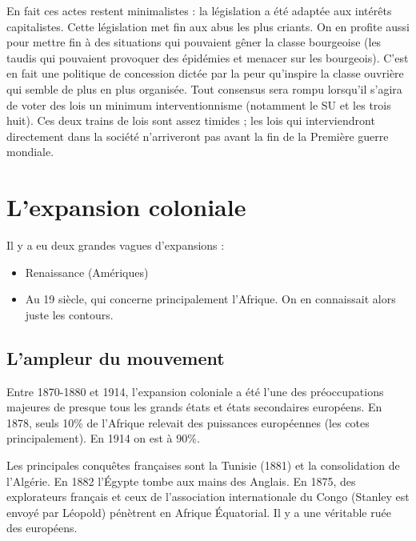 \documentclass[12pt]{report}
\begin{document}
En fait ces actes restent minimalistes : la législation a été adaptée aux intérêts capitalistes.
Cette législation met fin aux abus les plus criants. On en profite aussi pour mettre fin à des
situations qui pouvaient gêner la classe bourgeoise (les taudis qui pouvaient provoquer des
épidémies et menacer sur les bourgeois). C’est en fait une politique de concession dictée par
la peur qu’inspire la classe ouvrière qui semble de plus en plus organisée. Tout consensus sera
rompu lorsqu’il s’agira de voter des lois un minimum interventionnisme (notamment le SU et
les trois huit). Ces deux trains de lois sont assez timides ; les lois qui interviendront
directement dans la société n’arriveront pas avant la fin de la Première guerre mondiale.

\section{L'expansion coloniale}

Il y a eu deux grandes vagues d’expansions :
\begin{itemize}
	\item Renaissance (Amériques)
	\item Au 19 siècle, qui concerne principalement l'Afrique. On en connaissait alors juste les contours.
\end{itemize}

\subsection{L'ampleur du mouvement}

Entre 1870-1880 et 1914, l’expansion coloniale a été l’une des préoccupations majeures de
presque tous les grands états et états secondaires européens. En 1878, seuls 10\% de l’Afrique
relevait des puissances européennes (les cotes principalement). En 1914 on est à 90\%.

Les principales conquêtes françaises sont la Tunisie (1881) et la consolidation de l’Algérie.
En 1882 l’Égypte tombe aux mains des Anglais. En 1875, des explorateurs français et ceux de
l’association internationale du Congo (Stanley est envoyé par Léopold) pénètrent en Afrique
Équatorial. Il y a une véritable ruée des européens.
\end{document}
